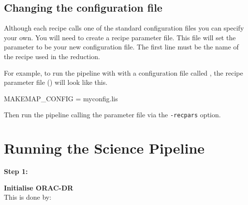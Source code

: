 \documentclass[11pt,oneside,chapters]{starlink}
\begin{document}
\subsection{Changing the configuration file}

Although each recipe calls one of the standard configuration files
you can specify your own. You will need to create a recipe parameter
file. This file will set the parameter  to be
your new configuration file. The first line must be the name of the
recipe used in the reduction.

For example, to run the pipeline with  with a
configuration file called , the recipe parameter file
() will look like this.
\vspace{0.2cm}
\begin{terminalv}
MAKEMAP_CONFIG = myconfig.lis
\end{terminalv}

Then run the pipeline calling the parameter file via the
\texttt{-recpars} option.
\begin{terminalv}
\end{terminalv}


\section{Running the Science Pipeline}
\label{sec:plsteps}

\begin{minipage}[t]{0.12\linewidth}
\textbf{Step 1:}
\end{minipage}
\begin{minipage}[t]{0.87\linewidth}
\textbf{Initialise ORAC-DR} \\This is done by:
\begin{terminalv}
\end{terminalv}
\end{minipage}
\end{document}
